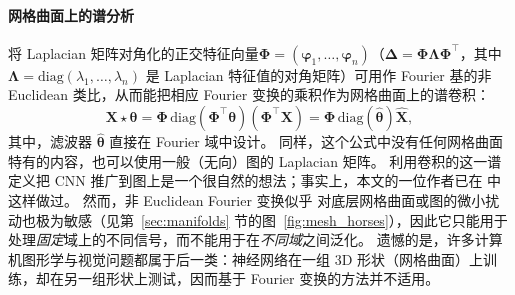 \paragraph{网格曲面上的谱分析}
%
将 Laplacian 矩阵对角化的正交特征向量\linebreak[4] $\boldsymbol{\Phi} = (\boldsymbol{\varphi}_1, \hdots, \boldsymbol{\varphi}_n)$（$\boldsymbol{\Delta} = \boldsymbol{\Phi} \boldsymbol{\Lambda} \boldsymbol{\Phi}^\top$，其中 $\boldsymbol{\Lambda} = \mathrm{diag}(\lambda_1, \hdots, \lambda_n)$ 是 Laplacian 特征值的对角矩阵）可用作 Fourier 基的非 Euclidean 类比，从而能把相应 Fourier 变换的乘积作为网格曲面上的谱卷积：
$$
\mathbf{X} \star \boldsymbol{\theta} = 
\boldsymbol{\Phi} \, \mathrm{diag}(\boldsymbol{\Phi}^\top \boldsymbol{\theta}) (\boldsymbol{\Phi}^\top \mathbf{X}) 
=
\boldsymbol{\Phi}\, \mathrm{diag}(\hat{\boldsymbol{\theta}}) \hat{\mathbf{X}},
$$
%
其中，滤波器 $\hat{\boldsymbol{\theta}}$ 直接在 Fourier 域中设计。
%
同样，这个公式中没有任何网格曲面特有的内容，也可以使用一般（无向）图的 Laplacian 矩阵。
%
%
利用卷积的这一谱定义把 CNN 推广到图上是一个很自然的想法；事实上，本文的一位作者已在 \cite{bruna2013spectral} 中这样做过。
%
然而，非 Euclidean Fourier 变换似乎
对底层网格曲面或图的微小扰动也极为敏感（见第~\ref{sec:manifolds} 节的图~\ref{fig:mesh_horses}），因此它只能用于处理{\em 固定}域上的不同信号，而不能用于在{\em 不同域}之间泛化。
%
遗憾的是，许多计算机图形学与视觉问题都属于后一类：神经网络在一组 3D 形状（网格曲面）上训练，却在另一组形状上测试，因而基于 Fourier 变换的方法并不适用。




